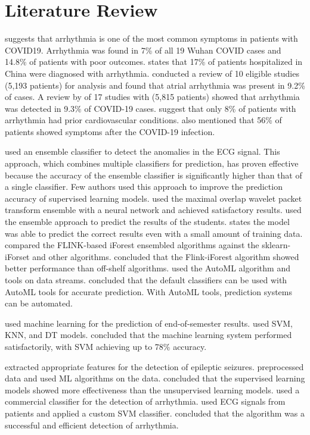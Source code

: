\section{Literature Review} \label{sec:literature_review}

\cite*{02_rp} suggests that arrhythmia is one of the most common symptoms in patients with COVID19. Arrhythmia was found in 7\% of all 19 Wuhan COVID cases and 14.8\% of patients with poor outcomes. \cite*{18_rp} states that 17\% of patients hospitalized in China were diagnosed with arrhythmia. \citeauthor{18_rp} conducted a review of 10 eligible studies (5,193 patients) for analysis and found that atrial arrhythmia was present in 9.2\% of cases. A review by \cite*{15_rp} of 17 studies with (5,815 patients) showed that arrhythmia was detected in 9.3\% of COVID-19 cases. \cite*{25_rp} suggest that only 8\% of patients with arrhythmia had prior cardiovascular conditions. \cite*{} also mentioned that 56\% of patients showed symptoms after the COVID-19 infection.

\cite*{24_rp} used an ensemble classifier to detect the anomalies in the ECG signal. This approach, which combines multiple classifiers for prediction, has proven effective because the accuracy of the ensemble classifier is significantly higher than that of a single classifier. Few authors used this approach to improve the prediction accuracy of supervised learning models. \cite*{10_rp} used the maximal overlap wavelet packet transform ensemble with a neural network and achieved satisfactory results. \cite*{20_rp} used the ensemble approach to predict the results of the students. \citeauthor{20_rp} states the model was able to predict the correct results even with a small amount of training data. \cite*{16_rp} compared the FLINK-based iForest ensembled algorithms against the sklearn-iForset and other algorithms. \citeauthor{16_rp} concluded that the Flink-iForest algorithm showed better performance than off-shelf algorithms. \cite*{11_rp} used the AutoML algorithm and tools on data streams. \citeauthor{11_rp} concluded that the default classifiers can be used with AutoML tools for accurate prediction. With AutoML tools, prediction systems can be automated.

\cite*{ref_paper_m1} used machine learning for the prediction of end-of-semester results. \cite*{ref_paper_m1} used SVM, KNN, and DT models. \cite*{ref_paper_m1} concluded that the machine learning system performed satisfactorily, with SVM achieving up to 78\% accuracy.

\cite*{23_rp} extracted appropriate features for the detection of epileptic seizures. \citeauthor{23_rp} preprocessed data and used ML algorithms on the data. \citeauthor{23_rp} concluded that the supervised learning models showed more effectiveness than the unsupervised learning models. \cite*{12_rp} used a commercial classifier for the detection of arrhythmia. \citeauthor{12_rp} used ECG signals from patients and applied a custom SVM classifier. \citeauthor{12_rp} concluded that the algorithm was a successful and efficient detection of arrhythmia.

